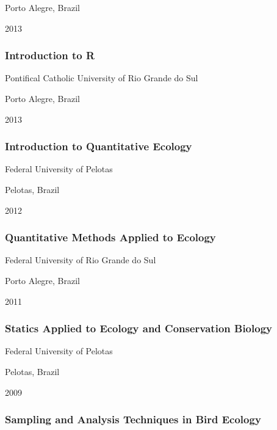 \documentclass[
]{article}
\begin{document}
Porto Alegre, Brazil

2013

\hypertarget{introduction-to-r}{%
\subsubsection{Introduction to R}\label{introduction-to-r}}

Pontifical Catholic University of Rio Grande do Sul

Porto Alegre, Brazil

2013

\hypertarget{introduction-to-quantitative-ecology-2}{%
\subsubsection{Introduction to Quantitative
Ecology}\label{introduction-to-quantitative-ecology-2}}

Federal University of Pelotas

Pelotas, Brazil

2012

\hypertarget{quantitative-methods-applied-to-ecology}{%
\subsubsection{Quantitative Methods Applied to
Ecology}\label{quantitative-methods-applied-to-ecology}}

Federal University of Rio Grande do Sul

Porto Alegre, Brazil

2011

\hypertarget{statics-applied-to-ecology-and-conservation-biology}{%
\subsubsection{Statics Applied to Ecology and Conservation
Biology}\label{statics-applied-to-ecology-and-conservation-biology}}

Federal University of Pelotas

Pelotas, Brazil

2009

\hypertarget{sampling-and-analysis-techniques-in-bird-ecology}{%
\subsubsection{Sampling and Analysis Techniques in Bird
Ecology}\label{sampling-and-analysis-techniques-in-bird-ecology}}
\end{document}
